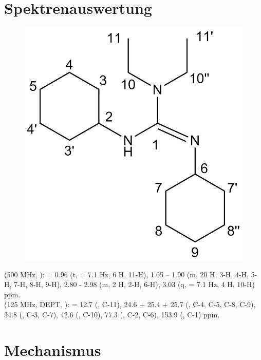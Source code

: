 \documentclass[12pt]{article}
\begin{document}
\begin{onehalfspace}
\section{Spektrenauswertung}
\begin{figure}[!htbp]
   \centering
\includegraphics[scale=0.3]{auswert.png}
\end{figure}

\noindent
\textbf{} (500 MHz, ): \sffamily \ce{$\delta$} =
0.96 (t,  = 7.1 \si{\hertz}, 6 H, 11-H),
1.05 – 1.90 (m, 20 H, 3-H, 4-H, 5-H, 7-H, 8-H, 9-H), 
2.80 - 2.98 (m, 2 H, 2-H, 6-H),
3.03 (q,  = 7.1 \si{\hertz}, 4 H, 10-H) ppm. \\
\noindent
\textbf{} (125 MHz, DEPT, ): \sffamily \ce{$\delta$} =
12.7 (, C-11),
24.6 + 25.4 + 25.7 (, C-4, C-5, C-8, C-9),
34.8 (, C-3, C-7),
42.6 (, C-10),
77.3 (, C-2, C-6),
153.9 (, C-1) ppm.
\section{Mechanismus\cite{bio}}


\end{onehalfspace}
\end{document}
